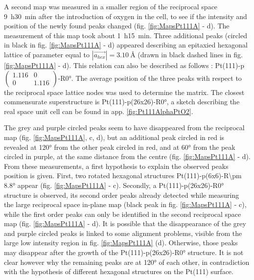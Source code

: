 A second map was measured in a smaller region of the reciprocal space \qty{9}{\hour}\qty{30}{\minute} after the introduction of oxygen in the cell, to see if the intensity and position of the newly found peaks changed (fig. \ref{fig:MapsPt111A} - d).
The measurement of this map took about \qty{1}{\hour}\qty{15}{\minute}.
Three additional peaks (circled in black in fig. \ref{fig:MapsPt111A} - d) appeared describing an epitaxied hexagonal lattice of parameter equal to $|\vec{a_{hex}}| = \qty{3.10}{\angstrom}$ (drawn in black dashed lines in fig. \ref{fig:MapsPt111A} - d).
This relation can also be described as follows : Pt(111)-p$\begin{pmatrix} 1.116 & 0 \\ 0 & 1.116 \end{pmatrix}$-R\ang{0}.
The average position of the three peaks with respect to the reciprocal space lattice nodes was used to determine the matrix.
The closest commensurate superstructure is Pt(111)-p(26x26)-R\ang{0}, a sketch describing the real space unit cell can be found in app. \ref{fig:Pt111AlphaPtO2}.

The grey and purple circled peaks seem to have disappeared from the reciprocal map (fig. \ref{fig:MapsPt111A}, c, d), but an additional peak circled in red is revealed at \ang{120} from the other peak circled in red, and at \ang{60} from the peak circled in purple, at the same distance from the centre (fig. \ref{fig:MapsPt111A} - d).
From these measurements, a first hypothesis to explain the observed peaks position is given.
First, two rotated hexagonal structures Pt(111)-p(6x6)-R\ang{\pm 8.8} appear (fig. \ref{fig:MapsPt111A} - c).
Secondly, a Pt(111)-p(26x26)-R\ang{0} structure is observed, its second order peaks already detected while measuring the large reciprocal space in-plane map (black peak in fig. \ref{fig:MapsPt111A} - c), while the first order peaks can only be identified in the second reciprocal space map (fig. \ref{fig:MapsPt111A} - d).
It is possible that the disappearance of the grey and purple circled peaks is linked to some alignment problems, visible from the large low intensity region in fig. \ref{fig:MapsPt111A} (d).
Otherwise, those peaks may disappear after the growth of the Pt(111)-p(26x26)-R\ang{0} structure.
It is not clear however why the remaining peaks are at \ang{120} of each other, in contradiction with the hypothesis of different hexagonal structures on the Pt(111) surface.

